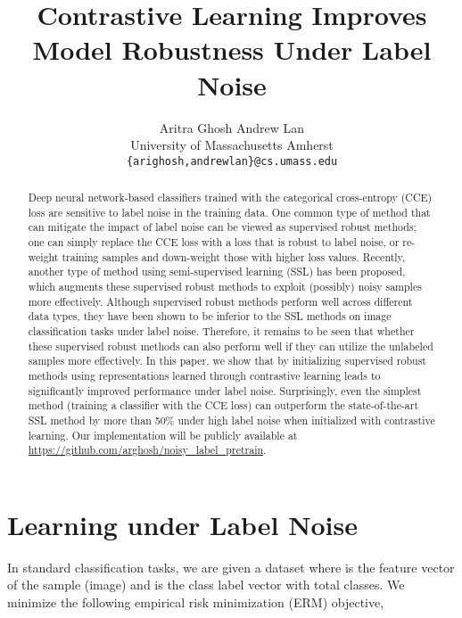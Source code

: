 \documentclass[final]{cvpr}
\begin{document}
\title{Contrastive Learning Improves Model Robustness Under Label Noise}

\author{Aritra Ghosh \qquad \qquad Andrew Lan\\
University of Massachusetts Amherst\\
{\tt\small \{arighosh,andrewlan\}@cs.umass.edu}
}

\maketitle


\begin{abstract}
Deep neural network-based classifiers trained with the categorical cross-entropy (CCE) loss are sensitive to label noise in the training data. One common type of method that can mitigate the impact of label noise can be viewed as supervised robust methods; one can simply replace the CCE loss with a loss that is robust to label noise, or re-weight training samples and down-weight those with higher loss values. Recently, another type of method using semi-supervised learning (SSL) has been proposed, which augments these supervised robust methods to exploit (possibly) noisy samples more effectively. Although supervised robust methods perform well across different data types, they have been shown to be inferior to the SSL methods on image classification tasks under label noise. Therefore, it remains to be seen that whether these supervised robust methods can also perform well if they can utilize the unlabeled samples more effectively. In this paper, we show that by initializing supervised robust methods using representations learned through contrastive learning leads to significantly improved performance under label noise. Surprisingly, even the simplest method (training a classifier with the CCE loss) can outperform the state-of-the-art SSL method by more than 50\% under high label noise when initialized with contrastive learning. Our implementation will be publicly available at {\url{https://github.com/arghosh/noisy_label_pretrain}}.
\end{abstract}


\vspace{-0.5cm}
\section{Learning under Label Noise}
In standard classification tasks, we are given a dataset  where   is the feature vector of the   sample (image) and  is the class label vector with  total classes. We minimize the following empirical risk minimization (ERM) objective, 
\vspace{-0.15in}
\end{document}
